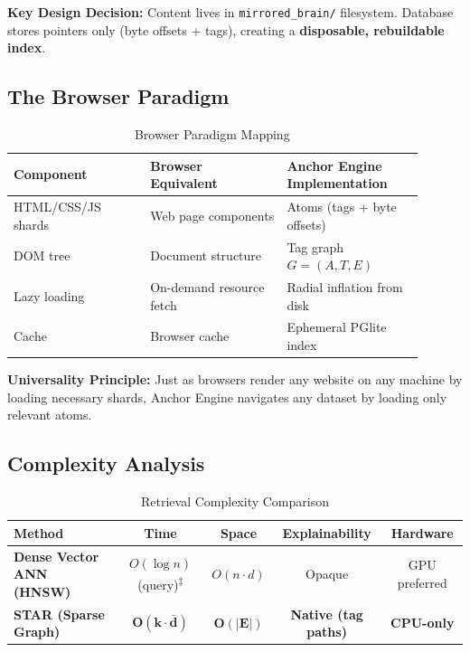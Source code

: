 \documentclass[11pt]{article}
\begin{document}
\textbf{Key Design Decision:} Content lives in \texttt{mirrored\_brain/} filesystem. Database stores pointers only (byte offsets + tags), creating a \textbf{disposable, rebuildable index}.

\subsection{The Browser Paradigm}

\begin{table}[h]
\centering
\caption{Browser Paradigm Mapping}
\label{tab:browser_paradigm}
\begin{tabular}{@{}p{0.3\linewidth}p{0.3\linewidth}p{0.3\linewidth}@{}}
\toprule
\textbf{Component} & \textbf{Browser Equivalent} & \textbf{Anchor Engine Implementation} \\ \midrule
HTML/CSS/JS shards & Web page components & Atoms (tags + byte offsets) \\
DOM tree & Document structure & Tag graph $G = (A, T, E)$ \\
Lazy loading & On-demand resource fetch & Radial inflation from disk \\
Cache & Browser cache & Ephemeral PGlite index \\ \bottomrule
\end{tabular}
\end{table}

\textbf{Universality Principle:} Just as browsers render any website on any machine by loading necessary shards, Anchor Engine navigates any dataset by loading only relevant atoms.

\subsection{Complexity Analysis}

\begin{table}[h]
\centering
\caption{Retrieval Complexity Comparison}
\label{tab:complexity}
\begin{tabular}{@{}lcccc@{}}
\toprule
\textbf{Method} & \textbf{Time} & \textbf{Space} & \textbf{Explainability} & \textbf{Hardware} \\ \midrule
\textbf{Dense Vector ANN (HNSW)} & $O(\log n)$ (query)\textsuperscript{$\ddagger$} & $O(n \cdot d)$ & Opaque & GPU preferred \\
\textbf{STAR (Sparse Graph)} & $\mathbf{O(k \cdot \bar{d})}$ & $\mathbf{O(|E|)}$ & \textbf{Native (tag paths)} & \textbf{CPU-only} \\ \bottomrule
\end{tabular}
\end{table}
\end{document}
